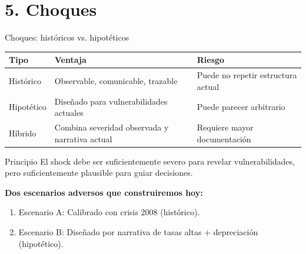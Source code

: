\documentclass[10pt,aspectratio=169]{beamer}
\begin{document}
\section{5. Choques}

\begin{frame}{Choques: históricos vs. hipotéticos}
\begin{table}
\small
\begin{tabular}{p{3.0cm}p{4.2cm}p{4.2cm}}
\toprule
Tipo & Ventaja & Riesgo \\
\midrule
Histórico & Observable, comunicable, trazable & Puede no repetir estructura actual \\
Hipotético & Diseñado para vulnerabilidades actuales & Puede parecer arbitrario \\
Híbrido & Combina severidad observada y narrativa actual & Requiere mayor documentación \\
\bottomrule
\end{tabular}
\end{table}

\begin{block}{Principio}
El shock debe ser suficientemente severo para revelar vulnerabilidades, pero suficientemente plausible para guiar decisiones.
\end{block}

\textbf{Dos escenarios adversos que construiremos hoy:}
\begin{enumerate}
  \item Escenario A: Calibrado con crisis 2008 (histórico).
  \item Escenario B: Diseñado por narrativa de tasas altas + depreciación (hipotético).
\end{enumerate}
\end{frame}
\end{document}
